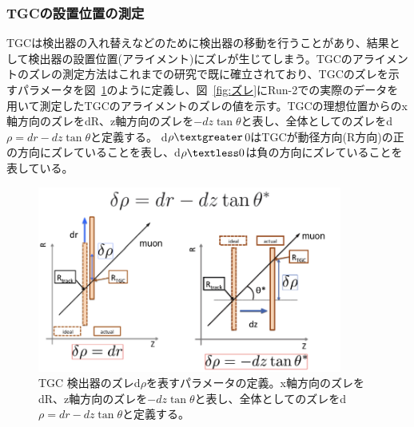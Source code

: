 \subsubsection{TGCの設置位置の測定}\label{ズレ}
TGCは検出器の入れ替えなどのために検出器の移動を行うことがあり、結果として検出器の設置位置(アライメント)にズレが生じてしまう。TGCのアライメントのズレの測定方法はこれまでの研究\cite{article:sano-mron}で既に確立されており、TGCのズレを示すパラメータを図~\ref{fig:dr_para}のように定義し、図~\ref{fig:ズレ}にRun-2での実際のデータを用いて測定したTGCのアライメントのズレの値を示す。TGCの理想位置からのx軸方向のズレをdR、z軸方向のズレを$-dz\tan\theta$と表し、全体としてのズレをd$\rho = dr-dz\tan\theta$と定義する。
d$\rho\textgreater$0はTGCが動径方向(R方向)の正の方向にズレていることを表し、d$\rho\textless0$は負の方向にズレていることを表している。
\begin{figure}[tb]
  \centering
  \includegraphics[clip, width=10cm]{fig/3/drho_param_position_measurement.png}
  \caption{TGC 検出器のズレd$\rho$を表すパラメータの定義。x軸方向のズレをdR、z軸方向のズレを$-dz\tan\theta$と表し、全体としてのズレをd$\rho = dr-dz\tan\theta$と定義する。}
  \label{fig:dr_para}
\end{figure}

